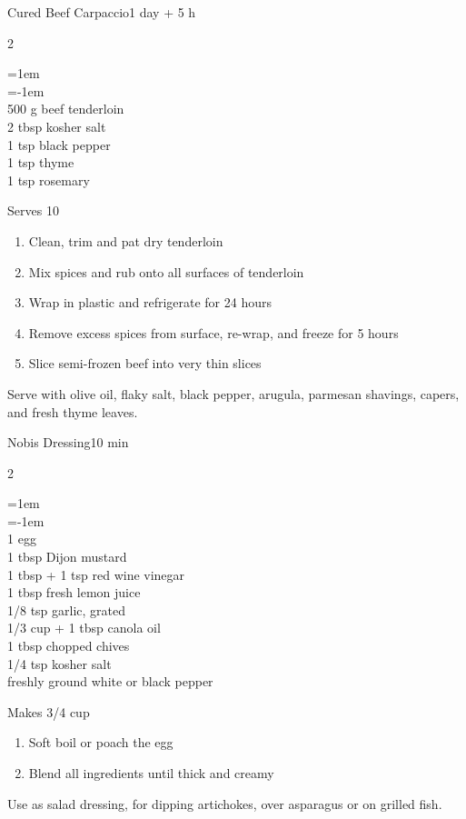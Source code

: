 \documentclass{article}
\newenvironment{recipe}[3][]
    {\begin{cardbase}[#1]{#2}{#3}
    \columnratio{0.333}
    \begin{paracol}{2}}
    {\end{paracol}\end{cardbase}}
\newenvironment{denserecipe}[3][]
    {\small
    \begin{recipe}[#1]{#2}{#3}}
    {\end{recipe}}
\newcommand{\nextcolumn}{\switchcolumn}
\newenvironment{ingredients}
    {
    \begin{obeylines}
    \vspace{\parskip}
    \setlength{\parskip}{0.25em}
    \vspace{-0.25em}
    \leftskip=1em
    \parindent=-1em}
    {\end{obeylines}}
\newenvironment{steps}
    {\begin{enumerate}[leftmargin=*,topsep=0pt]}
    {\end{enumerate}}
\newcommand{\tag}[1]{\hspace{1em}#1}
\newcommand{\symboltag}[2]{\tag{#1\hspace{0.4em}#2}}
\newcommand{\totaltime}[1]{\symboltag{\raisebox{-0.1em}{\small\StopWatchEnd}}{#1}}
\begin{document}
\begin{denserecipe}{Cured Beef Carpaccio}{\totaltime{1 day + 5 h}}
\begin{ingredients}
500 g beef tenderloin
2 tbsp kosher salt
1 tsp black pepper
1 tsp thyme
1 tsp rosemary
\end{ingredients}
\nextcolumn
Serves 10
\begin{steps}
\item Clean, trim and pat dry tenderloin
\item Mix spices and rub onto all surfaces of tenderloin
\item Wrap in plastic and refrigerate for 24 hours
\item Remove excess spices from surface, re-wrap, and freeze for 5 hours
\item Slice semi-frozen beef into very thin slices
\end{steps}
Serve with olive oil, flaky salt, black pepper, arugula, parmesan shavings, capers, and fresh thyme leaves.
\end{denserecipe}

\begin{denserecipe}{Nobis Dressing}{\totaltime{10 min}}
\begin{ingredients}
1 egg
1 tbsp Dijon mustard
1 tbsp + 1 tsp red wine vinegar
1 tbsp fresh lemon juice
1/8 tsp garlic, grated
1/3 cup + 1 tbsp canola oil
1 tbsp chopped chives
1/4 tsp kosher salt
freshly ground white or black pepper
\end{ingredients}
\nextcolumn
Makes 3/4 cup
\begin{steps}
\item Soft boil or poach the egg
\item Blend all ingredients until thick and creamy
\end{steps}

Use as salad dressing, for dipping artichokes, over asparagus or on grilled fish.
\end{denserecipe}
\end{document}
